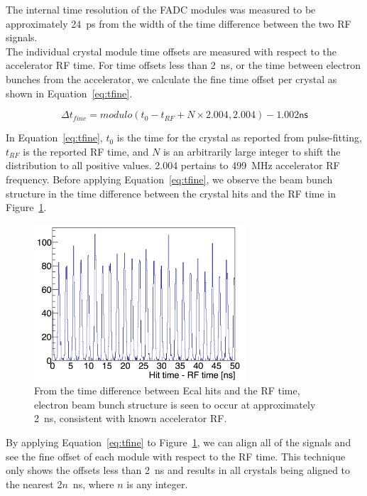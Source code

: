 \documentclass[12pt]{report}
\begin{document}
The internal time resolution of the FADC modules was measured to be approximately 24~ps from the width of the time difference between the two RF signals. \\
\indent The individual crystal module time offsets are measured with respect to the accelerator RF time. For time offsets less than 2~ns, or the time between electron bunches from the accelerator, we calculate the fine time offset per crystal as shown in Equation~\eqref{eq:tfine}.

\begin{equation}
	\label{eq:tfine}
	\Delta t_{fine} = modulo(t_0 - t_{RF} + N\times 2.004, 2.004) - 1.002 \textsf{ns}
\end{equation}

In Equation~\eqref{eq:tfine}, $t_0$ is the time for the crystal as reported from pulse-fitting, $t_{RF}$ is the reported RF time, and $N$ is an arbitrarily large integer to shift the distribution to all positive values. 2.004 pertains to 499~MHz accelerator RF frequency. Before applying Equation~\eqref{eq:tfine}, we observe the beam bunch structure in the time difference between the crystal hits and the RF time in Figure~\ref{Figure:beamBunch}. 

\begin{figure}[H]
  \centering
      \includegraphics[width=0.7\textwidth]{pics/performance/beamStructure.png}
  \caption[Time difference between Ecal hits and RF time]{From the time difference between Ecal hits and the RF time, electron beam bunch structure is seen to occur at approximately 2~ns, consistent with known accelerator RF.}
  \label{Figure:beamBunch}
\end{figure}

By applying Equation~\eqref{eq:tfine} to Figure~\ref{Figure:beamBunch}, we can align all of the signals and see the fine offset of each module with respect to the RF time. This technique only shows the offsets less than 2~ns and results in all crystals being aligned to the nearest 2$n$~ns, where $n$ is any integer. 
\end{document}
